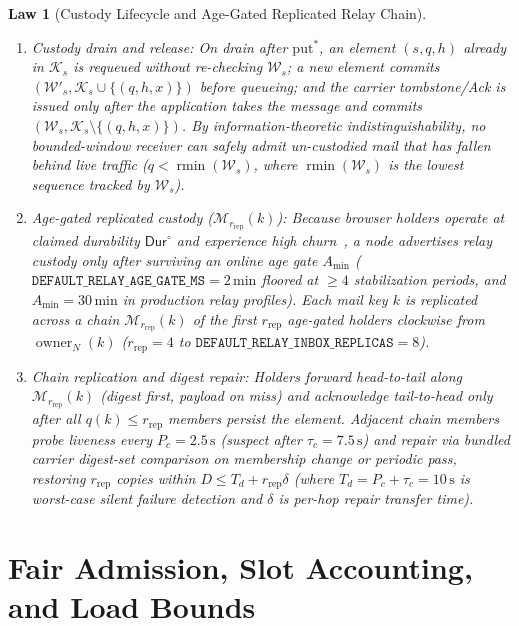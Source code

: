 \documentclass[journal]{IEEEtran}
\newtheorem{law}{Law}
\begin{document}
\begin{law}[Custody Lifecycle and Age-Gated Replicated Relay Chain]\label{law:replicated-custody}
\leavevmode
\begin{enumerate}[leftmargin=1.5em]
\item \emph{Custody drain and release:} On drain after $\mathrm{put}^*$, an
element $(s,q,h)$ already in $\mathcal{K}_s$ is requeued without re-checking
$\mathcal{W}_s$; a new element commits $(\mathcal{W}'_s,\mathcal{K}_s\cup\{(q,h,x)\})$
before queueing; and the carrier tombstone/Ack is issued only after the
application takes the message and commits $(\mathcal{W}_s,\mathcal{K}_s\setminus\{(q,h,x)\})$.
By information-theoretic indistinguishability, no bounded-window receiver can
safely admit un-custodied mail that has fallen behind live traffic ($q<\operatorname{rmin}(\mathcal{W}_s)$, where $\operatorname{rmin}(\mathcal{W}_s)$ is the lowest sequence tracked by $\mathcal{W}_s$).
\item \emph{Age-gated replicated custody ($\mathcal{M}_{r_{\mathrm{rep}}}(k)$):} Because browser
holders operate at claimed durability $\mathsf{Dur}^\circ$ and experience high
churn~\cite{BlakeRodrigues}, a node advertises relay custody only after
surviving an online age gate $A_{\min}$ ($\mathtt{DEFAULT\_RELAY\_AGE\_GATE\_MS}=2\,\mathrm{min}$
floored at $\ge 4$ stabilization periods, and $A_{\min}=30\,\mathrm{min}$ in production
relay profiles).  Each mail key $k$ is replicated
across a chain $\mathcal{M}_{r_{\mathrm{rep}}}(k)$ of the first $r_{\mathrm{rep}}$ age-gated holders clockwise
from $\operatorname{owner}_N(k)$ ($r_{\mathrm{rep}}=4$ to $\mathtt{DEFAULT\_RELAY\_INBOX\_REPLICAS}=8$).
\item \emph{Chain replication and digest repair:} Holders forward head-to-tail
along $\mathcal{M}_{r_{\mathrm{rep}}}(k)$ (digest first, payload on miss) and acknowledge
tail-to-head only after all $q(k)\le r_{\mathrm{rep}}$ members persist the element.  Adjacent
chain members probe liveness every $P_c=2.5\,\mathrm{s}$ (suspect after
$\tau_c=7.5\,\mathrm{s}$) and repair via bundled carrier digest-set comparison on
membership change or periodic pass, restoring $r_{\mathrm{rep}}$ copies within $D\le T_d+r_{\mathrm{rep}}\delta$
(where $T_d=P_c+\tau_c=10\,\mathrm{s}$ is worst-case silent failure detection and
$\delta$ is per-hop repair transfer time).
\end{enumerate}
\end{law}

\section{Fair Admission, Slot Accounting, and Load Bounds}\label{sec:load}
\end{document}
